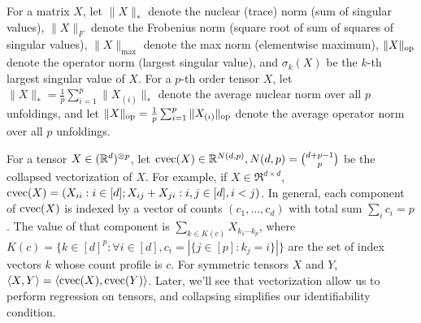 For a matrix $X$,
let $\|X\|_*$ denote the nuclear (trace) norm (sum of singular values),
$\|X\|_F$ denote the Frobenius norm (square root of sum of squares of singular values),
$\|X\|_{\max}$ denote the max norm (elementwise maximum),
$\|X\|_{\textrm{op}}$ denote the operator norm (largest singular value), and
$\sigma_k(X)$ be the $k$-th largest singular value of $X$.
For a $p$-th order tensor $X$,
let $\|X\|_* = \frac{1}{p} \sum_{i=1}^p \|X_{(i)}\|_*$ denote
the average nuclear norm over all $p$ unfoldings,
and let $\|X\|_{\textrm{op}} = \frac{1}{p} \sum_{i=1}^p \|X_{(i)}\|_{\textrm{op}}$
denote the average operator norm over all $p$ unfoldings.

For a tensor $X \in (\mathbb{R}^d)^{\otimes p}$, let $\operatorname{cvec}(X) \in
\mathbb{R}^{N(d,p)}, N(d,p) = \binom{d + p - 1}{p}$ be the collapsed vectorization of
$X$. For example, if $X \in \Re^{d \times d}$, $\operatorname{cvec}(X)
= (X_{ii} : i \in [d]; X_{ij} + X_{ji} : i,j \in [d], i<j)$.
In general, each component of $\operatorname{cvec}(X)$ is indexed by a vector of
counts $(c_1, \dots, c_d)$ with total sum $\sum_i c_i = p$.  The value
of that component is $\sum_{k \in K(c)} X_{k_1 \cdots k_p}$, where $K(c)
= \{ k \in [d]^p : \forall i \in [d], c_i = |\{ j \in [p] : k_j = i \}|
\}$ are the set of index vectors $k$ whose count profile is $c$.
For symmetric tensors $X$ and $Y$, $\langle X, Y \rangle = \langle \operatorname{cvec}(X), \operatorname{cvec}(Y) \rangle$.
Later, we'll see that vectorization allow us to perform regression on tensors,
and collapsing simplifies our identifiability condition.
